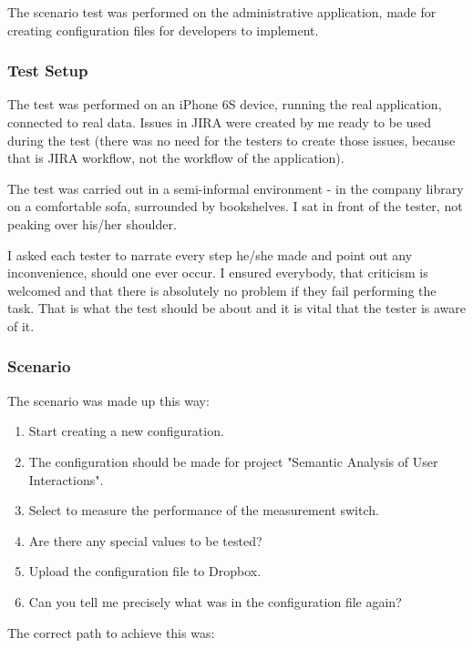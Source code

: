 The scenario test was performed on the administrative application, made for creating configuration files for developers to implement.

\subsubsection{Test Setup}

The test was performed on an iPhone 6S device, running the real application, connected to real data. Issues in JIRA were created by me ready to be used during the test (there was no need for the testers to create those issues, because that is JIRA workflow, not the workflow of the application).

The test was carried out in a semi-informal environment - in the company library on a comfortable sofa, surrounded by bookshelves. I sat in front of the tester, not peaking over his/her shoulder. 

I asked each tester to narrate every step he/she made and point out any inconvenience, should one ever occur. I ensured everybody, that criticism is welcomed and that there is absolutely no problem if they fail performing the task. That is what the test should be about and it is vital that the tester is aware of it.

\subsubsection{Scenario}

The scenario was made up this way:

\begin{enumerate}
	\item Start creating a new configuration.
	\item The configuration should be made for project "Semantic Analysis of User Interactions".
	\item Select to measure the performance of the measurement switch.
	\item Are there any special values to be tested?
	\item Upload the configuration file to Dropbox.
	\item Can you tell me precisely what was in the configuration file again?
\end{enumerate}

The correct path to achieve this was:

